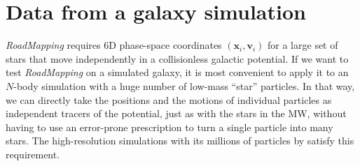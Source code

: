 \documentclass[iop,revtex4,numberedappendix,appendixfloats]{emulateapj}
\newcommand{\vect}[1]{\boldsymbol{#1}}
\newcommand{\RM}{{\sl RoadMapping}}
\begin{document}
\section{Data from a galaxy simulation} \label{sec:simulation}

\RM{} requires 6D phase-space coordinates $(\vect{x}_i,\vect{v}_i)$ for a large set of stars that move independently in a collisionless galactic potential. If we want to test \RM{} on a simulated galaxy, it is most convenient to apply it to an $N$-body simulation with a huge number of low-mass ``star'' particles. In that way, we can directly take the positions and the motions of individual particles as independent tracers of the potential, just as with the stars in the MW, without having to use an error-prone prescription to turn a single particle into many stars. The high-resolution simulations with its millions of particles by \citet{2013ApJ...766...34D} satisfy this requirement.
\end{document}
